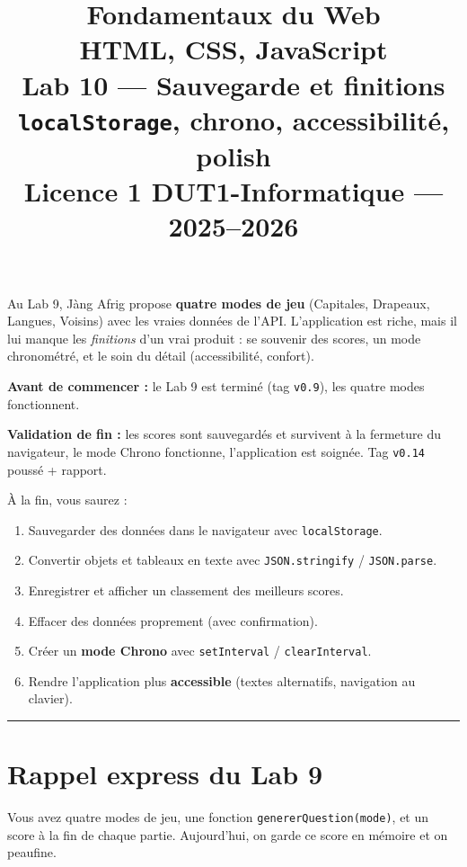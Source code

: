 \documentclass[11pt,a4paper]{article}
\title{%
\vspace{-1cm}
\textbf{\LARGE Fondamentaux du Web}\\
\textbf{\LARGE HTML, CSS, JavaScript}\\[0.8cm]
\textbf{\huge Lab 10 --- Sauvegarde et finitions}\\[0.3cm]
\textbf{\Large \texttt{localStorage}, chrono, accessibilité, polish}\\[0.5cm]
\large Licence 1 DUT1-Informatique --- 2025--2026}
\date{}
\author{}
\newcommand{\code}[1]{\texttt{#1}}
\begin{document}
\maketitle
\thispagestyle{empty}

\begin{prereqbox}
Au Lab 9, Jàng Afrig propose \textbf{quatre modes de jeu} (Capitales, Drapeaux, Langues, Voisins) avec les vraies données de l'API. L'application est riche, mais il lui manque les \emph{finitions} d'un vrai produit : se souvenir des scores, un mode chronométré, et le soin du détail (accessibilité, confort).

\smallskip
\textbf{Avant de commencer :} le Lab 9 est terminé (tag \code{v0.9}), les quatre modes fonctionnent.

\smallskip
\textbf{Validation de fin :} les scores sont sauvegardés et survivent à la fermeture du navigateur, le mode Chrono fonctionne, l'application est soignée. Tag \code{v0.14} poussé + rapport.
\end{prereqbox}

\begin{objectifbox}
À la fin, vous saurez :
\begin{enumerate}[leftmargin=*,noitemsep]
  \item Sauvegarder des données dans le navigateur avec \code{localStorage}.
  \item Convertir objets et tableaux en texte avec \code{JSON.stringify} / \code{JSON.parse}.
  \item Enregistrer et afficher un classement des meilleurs scores.
  \item Effacer des données proprement (avec confirmation).
  \item Créer un \textbf{mode Chrono} avec \code{setInterval} / \code{clearInterval}.
  \item Rendre l'application plus \textbf{accessible} (textes alternatifs, navigation au clavier).
\end{enumerate}
\end{objectifbox}

\tableofcontents
\bigskip\hrule\bigskip

\section*{Rappel express du Lab 9}
Vous avez quatre modes de jeu, une fonction \code{genererQuestion(mode)}, et un score à la fin de chaque partie. Aujourd'hui, on garde ce score en mémoire et on peaufine.
\end{document}
